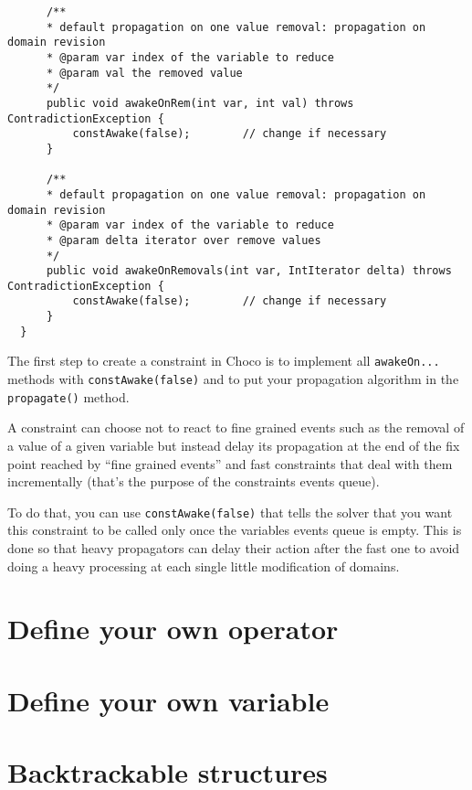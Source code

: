 \begin{lstlisting}
      /**
      * default propagation on one value removal: propagation on domain revision
      * @param var index of the variable to reduce
      * @param val the removed value
      */
      public void awakeOnRem(int var, int val) throws ContradictionException {
          constAwake(false);        // change if necessary
      }
	
      /**
      * default propagation on one value removal: propagation on domain revision
      * @param var index of the variable to reduce
      * @param delta iterator over remove values
      */
      public void awakeOnRemovals(int var, IntIterator delta) throws ContradictionException {
          constAwake(false);        // change if necessary
      }
  }
\end{lstlisting}

The first step to create a constraint in Choco is to implement all \texttt{awakeOn...} methods with \texttt{constAwake(false)} and to put your propagation algorithm in the \texttt{propagate()} method. 

A constraint can choose not to react to fine grained events such as the removal of a value of a given variable but instead delay its propagation at the end of the fix point reached by ``fine grained events'' and fast constraints that deal with them incrementally (that's the purpose of the constraints events queue). 

To do that, you can use \texttt{constAwake(false)} that tells the solver that you want this constraint to be called only once the variables events queue is empty. This is done so that heavy propagators can delay their action after the fast one to avoid doing a heavy processing at each single little modification of domains.

\section{Define your own operator}\label{advanced:defineyourownoperator}\hypertarget{advanced:defineyourownoperator}{}

\section{Define your own variable}\label{advanced:defineyourownvariable}\hypertarget{advanced:defineyourownvariable}{}

\section{Backtrackable structures}\label{advanced:backtrackablestructures}\hypertarget{advanced:backtrackablestructures}{}

